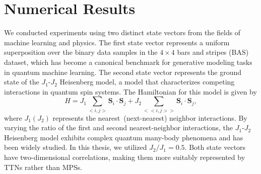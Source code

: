 \documentclass[12pt,dvipdfmx,twoside,openright]{report}
\begin{document}






\cleardoublepage
\chapter{Numerical Results}
We conducted experiments using two distinct state vectors from the fields of machine learning and physics.
The first state vector represents a uniform superposition over the binary data samples in the $4 \times 4$ bars and stripes (BAS) dataset, which has become a canonical benchmark for generative modeling tasks in quantum machine learning.
The second state vector represents the ground state of the $J_1$-$J_2$ Heisenberg model, a model that characterizes competing interactions in quantum spin systems.
The Hamiltonian for this model is given by
\begin{equation}
    H=J_1 \sum_{<i,j>} \bm{S}_i \cdot \bm{S}_j + J_2 \sum_{<<i,j>>} \bm{S}_i \cdot \bm{S}_j,
\end{equation}
where $J_1(J_2)$ represents the nearest~(next-nearest) neighbor interactions. 
By varying the ratio of the first and second nearest-neighbor interactions, the $J_1$-$J_2$ Heisenberg model exhibits complex quantum many-body phenomena and has been widely studied.
In this thesis, we utilized $J_2/J_1=0.5$.
Both state vectors have two-dimensional correlations, making them more suitably represented by TTNs rather than MPSs.
\end{document}
